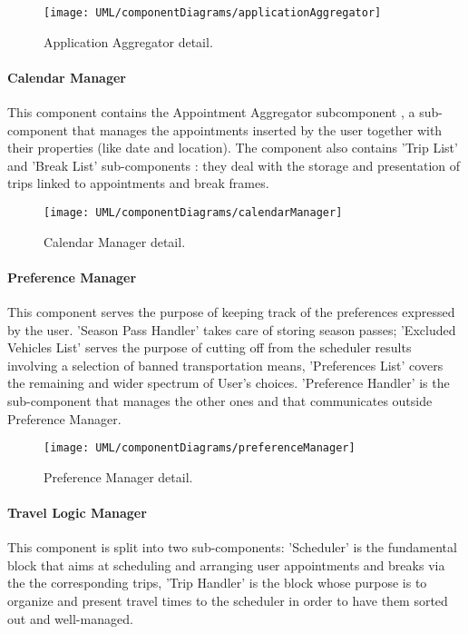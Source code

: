 		\begin{figure}[H]
			\centering
			\texttt{[image: UML/componentDiagrams/applicationAggregator]}
			\caption{Application Aggregator detail.}
			\label{applicationAggregatorDetail}
		\end{figure}
 
 
	\paragraph{Calendar Manager}
	
		This component contains the Appointment Aggregator subcomponent , a sub-component that manages the appointments inserted by the user together with their properties (like date and location).
		The component also contains 'Trip List' and 'Break List' sub-components : they deal with the storage and presentation of trips linked to appointments and break frames.

	
		\begin{figure}[H]
			\centering
			\texttt{[image: UML/componentDiagrams/calendarManager]}
			\caption{Calendar Manager detail.}
			\label{calendarManagerDetail}
		\end{figure}
 

	\paragraph{Preference Manager}
		This component serves the purpose of keeping track of the preferences expressed by the user. 'Season Pass Handler' takes care of storing season passes; 'Excluded Vehicles List' serves the purpose of cutting off from the scheduler results involving a selection of banned transportation means, 'Preferences List' covers the remaining and wider spectrum of User's choices. 'Preference Handler' is the sub-component that manages the other ones and that communicates outside Preference Manager.

		\begin{figure}[H]
			\centering
			\texttt{[image: UML/componentDiagrams/preferenceManager]}
			\caption{Preference Manager detail.}
			\label{preferenceManagerDetail}
		\end{figure}


	\paragraph{Travel Logic Manager}
		This component is split into two sub-components: 'Scheduler' is the fundamental block that aims at scheduling and arranging user appointments and breaks via the the corresponding trips, 'Trip Handler' is the block whose purpose is to organize and present travel times to the scheduler in order to have them sorted out and well-managed.

